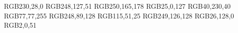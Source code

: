 \usepackage{tikz}
\usepackage{pgfplots}
\pgfplotsset{compat=1.18}
\usepackage{amsmath}
\usepackage{amssymb}
\usepackage{dsfont}
\usepackage{subcaption}


\definecolor{bar}      {RGB}{230,28,0}
\definecolor{crook}    {RGB}{248,127,51}
\definecolor{crown}    {RGB}{250,165,178}
\definecolor{sphinx}   {RGB}{25,0,127}
\definecolor{snake}    {RGB}{40,230,40}
\definecolor{yacht}    {RGB}{77,77,255}
\definecolor{chevron}  {RGB}{248,89,128}
\definecolor{signpost} {RGB}{115,51,25}
\definecolor{lobster}  {RGB}{249,126,128}
\definecolor{hook}     {RGB}{26,128,0}
\definecolor{hexagon}  {RGB}{2,0,51}


\newcommand{\set}[1]{\{#1\}}

\DeclareMathOperator{\rmd}{d}
\DeclareMathOperator{\abs}{abs}

\edef\sqthreeotwo{\pgfmathresult}

\def\eisToCar#1#2{
  \edef\a{#1}
  \edef\b{#2}
  \pgfmathparse{-\b/2}
  \edef\bwRe{\pgfmathresult}
  \pgfmathparse{\b*\sqthreeotwo}
  \edef\bwIm{\pgfmathresult}
  \pgfmathparse{\a+\bwRe}
  \xdef\currX{\pgfmathresult}
  \xdef\currY{\bwIm}%
}

\def\rotateNinety#1#2{ 
  \edef\x{#1}
  \edef\y{#2}
  \xdef\rotY{#1}
  \pgfmathparse{-#2}
  \xdef\rotX{\pgfmathresult}
  }

\gdef\one{1}
\gdef\zero{0}

\def\writeb#1{\pgfmathparse{#1 >= 0}\ifx\pgfmathresult\one+#1\else#1\fi}


\xdef\maxSteps{5}

\xdef\sqthree{\pgfmathresult}

\gdef\testInGrid#1#2#3{
  \pgfmathparse{#1*#2 <= 0}
  \edef\oppSign{\pgfmathresult}
  \ifx\oppSign\one
  \pgfmathparse{abs(#1) + abs(#2)}
  \else\pgfmathparse{max(abs(#1), abs(#2))}
  \fi
  \edef\manhattanDist{\pgfmathresult}
  \pgfmathparse{\manhattanDist <= #3}
  \xdef\withinGrid{\pgfmathresult}
}
